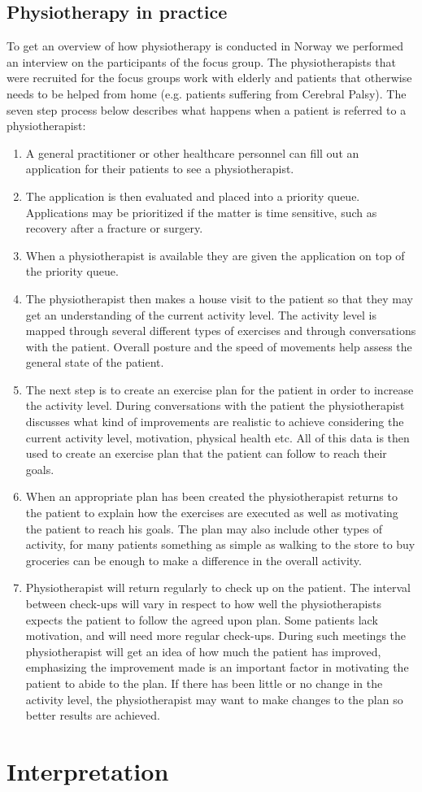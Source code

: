 \subsection{Physiotherapy in practice} 
To get an overview of how physiotherapy is conducted in Norway we performed an interview on the participants of the focus group. The physiotherapists that were recruited for the focus groups work with elderly and patients that otherwise needs to be helped from home (e.g. patients suffering from Cerebral Palsy). The seven step process below describes what happens when a patient is referred to a physiotherapist:

\vspace{-4mm}
\begin{enumerate}
  \item A general practitioner or other healthcare personnel can fill out an application for their patients to see a physiotherapist.
  \item The application is then evaluated and placed into a priority queue. Applications may be prioritized if the matter is time sensitive, such as recovery after a fracture or surgery.
  \item When a physiotherapist is available they are given the application on top of the priority queue.
  \item The physiotherapist then makes a house visit to the patient so that they may get an understanding of the current activity level. The activity level is mapped through several different types of exercises and through conversations with the patient. Overall posture and the speed of movements help assess the general state of the patient.
  \item The next step is to create an exercise plan for the patient in order to increase the activity level. During conversations with the patient the physiotherapist discusses what kind of improvements are realistic to achieve considering the current activity level, motivation, physical health etc. All of this data is then used to create an exercise plan that the patient can follow to reach their goals.
  \item When an appropriate plan has been created the physiotherapist returns to the patient to explain how the exercises are executed as well as motivating the patient to reach his goals. The plan may also include other types of activity, for many patients something as simple as walking to the store to buy groceries can be enough to make a difference in the overall activity.
  \item Physiotherapist will return regularly to check up on the patient. The interval between check-ups will vary in respect to how well the physiotherapists expects the patient to follow the agreed upon plan. Some patients lack motivation, and will need more regular check-ups. During such meetings the physiotherapist will get an idea of how much the patient has improved, emphasizing the improvement made is an important factor in motivating the patient to abide to the plan. If there has been little or no change in the activity level, the physiotherapist may want to make changes to the plan so better results are achieved.
\end{enumerate}

\section{Interpretation}

